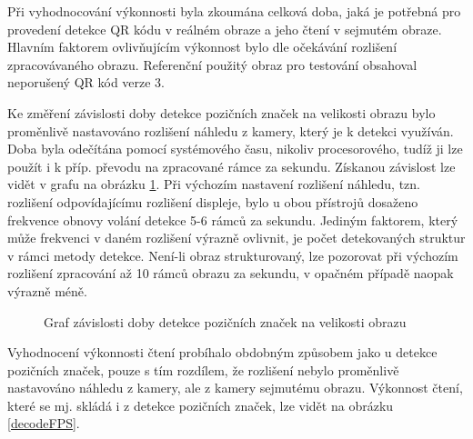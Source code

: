 Při vyhodnocování výkonnosti byla zkoumána celková doba, jaká je potřebná pro
provedení detekce QR kódu v reálném obraze a jeho čtení v sejmutém obraze.
Hlavním faktorem ovlivňujícím výkonnost bylo dle očekávání rozlišení
zpracovávaného obrazu. Referenční použitý obraz pro testování obsahoval
neporušený QR kód verze 3.

Ke změření závislosti doby detekce pozičních značek na velikosti obrazu bylo
proměnlivě nastavováno rozlišení náhledu z kamery, který je k detekci využíván.
Doba byla odečítána pomocí systémového času, nikoliv procesorového, tudíž ji
lze použít i k příp. převodu na zpracované rámce za sekundu. Získanou závislost
lze vidět v grafu na obrázku \ref{detectionFPS}. Při výchozím nastavení
rozlišení náhledu, tzn.
rozlišení odpovídajícímu rozlišení displeje, bylo u obou přístrojů dosaženo
frekvence obnovy volání detekce 5-6 rámců za sekundu. Jediným faktorem, který
může frekvenci v daném rozlišení výrazně ovlivnit, je počet detekovaných
struktur v rámci metody detekce. Není-li obraz strukturovaný, lze pozorovat při výchozím
rozlišení zpracování až 10 rámců obrazu za sekundu, v opačném případě naopak
výrazně méně.

 \begin{figure}[H]
  \begin{center}
    \caption{Graf závislosti doby detekce pozičních značek na velikosti obrazu}
    \label{detectionFPS}
  \end{center}
\end{figure}

Vyhodnocení výkonnosti čtení probíhalo obdobným způsobem jako u detekce
pozičních značek, pouze s tím rozdílem, že rozlišení nebylo proměnlivě
nastavováno náhledu z kamery, ale z kamery sejmutému obrazu. Výkonnost čtení,
které se mj. skládá i z detekce pozičních značek, lze vidět na obrázku
\ref{decodeFPS}.

